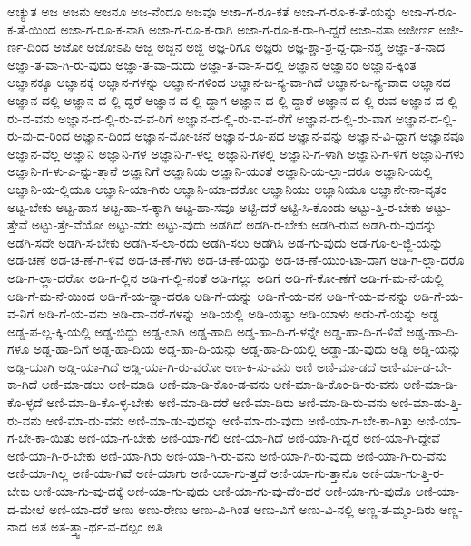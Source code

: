 {ಅಚ್ಯುತ
ಅಜ
ಅಜನು
ಅಜನೂ
ಅಜ-ನೆಂದೂ
ಅಜವೂ
ಅಜಾ-ಗ-ರೂ-ಕತೆ
ಅಜಾ-ಗ-ರೂ-ಕ-ತೆ-ಯನ್ನು
ಅಜಾ-ಗ-ರೂ-ಕ-ತೆ-ಯಿಂದ
ಅಜಾ-ಗ-ರೂ-ಕ-ನಾಗಿ
ಅಜಾ-ಗ-ರೂ-ಕ-ರಾಗಿ
ಅಜಾ-ಗ-ರೂ-ಕ-ರಾ-ಗಿ-ದ್ದರೆ
ಅಜಾ-ನತಾ
ಅಜೀರ್ಣ
ಅಜೀ-ರ್ಣ-ದಿಂದ
ಅಜೋ
ಅಜೋಽಪಿ
ಅಜ್ಜ
ಅಜ್ಜನ
ಅಜ್ಜಿ
ಅಜ್ಞ-ರಿಗೂ
ಅಜ್ಞರು
ಅಜ್ಞ-ಶ್ಚಾ-ಶ್ರ-ದ್ದ-ಧಾ-ನಶ್ಚ
ಅಜ್ಞಾ-ತ-ನಾದ
ಅಜ್ಞಾ-ತ-ವಾ-ಗಿ-ರು-ವುದು
ಅಜ್ಞಾ-ತ-ವಾ-ದುದು
ಅಜ್ಞಾ-ತ-ವಾ-ಸ-ದಲ್ಲಿ
ಅಜ್ಞಾನ
ಅಜ್ಞಾನಂ
ಅಜ್ಞಾನ-ಕ್ಕಿಂತ
ಅಜ್ಞಾನಕ್ಕೂ
ಅಜ್ಞಾನಕ್ಕೆ
ಅಜ್ಞಾನ-ಗಳನ್ನು
ಅಜ್ಞಾನ-ಗಳಿಂದ
ಅಜ್ಞಾನ-ಜ-ನ್ಯ-ವಾ-ಗಿದೆ
ಅಜ್ಞಾನ-ಜ-ನ್ಯ-ವಾದ
ಅಜ್ಞಾನದ
ಅಜ್ಞಾನ-ದಲ್ಲಿ
ಅಜ್ಞಾನ-ದ-ಲ್ಲಿ-ದ್ದರೆ
ಅಜ್ಞಾನ-ದ-ಲ್ಲಿ-ದ್ದಾಗ
ಅಜ್ಞಾನ-ದ-ಲ್ಲಿ-ದ್ದಾರೆ
ಅಜ್ಞಾನ-ದ-ಲ್ಲಿ-ರುವ
ಅಜ್ಞಾನ-ದ-ಲ್ಲಿ-ರು-ವ-ವನು
ಅಜ್ಞಾನ-ದ-ಲ್ಲಿ-ರು-ವ-ವ-ರಿಗೆ
ಅಜ್ಞಾನ-ದ-ಲ್ಲಿ-ರು-ವ-ವ-ರೆಗೆ
ಅಜ್ಞಾನ-ದ-ಲ್ಲಿ-ರು-ವಾಗ
ಅಜ್ಞಾನ-ದ-ಲ್ಲಿ-ರು-ವು-ದ-ರಿಂದ
ಅಜ್ಞಾನ-ದಿಂದ
ಅಜ್ಞಾನ-ಮೋ-ಚನೆ
ಅಜ್ಞಾನ-ರೂ-ಪದ
ಅಜ್ಞಾನ-ವನ್ನು
ಅಜ್ಞಾನ-ವಿ-ದ್ದಾಗ
ಅಜ್ಞಾನವೂ
ಅಜ್ಞಾನ-ವೆಲ್ಲ
ಅಜ್ಞಾನಿ
ಅಜ್ಞಾನಿ-ಗಳ
ಅಜ್ಞಾನಿ-ಗ-ಳಲ್ಲ
ಅಜ್ಞಾನಿ-ಗಳಲ್ಲಿ
ಅಜ್ಞಾನಿ-ಗ-ಳಾಗಿ
ಅಜ್ಞಾನಿ-ಗ-ಳಿಗೆ
ಅಜ್ಞಾನಿ-ಗಳು
ಅಜ್ಞಾನಿ-ಗ-ಳು-ಎ-ನ್ನು-ತ್ತಾನೆ
ಅಜ್ಞಾನಿಗೆ
ಅಜ್ಞಾನಿಯ
ಅಜ್ಞಾನಿ-ಯಂತೆ
ಅಜ್ಞಾನಿ-ಯ-ಲ್ಲಾ-ದರೂ
ಅಜ್ಞಾನಿ-ಯಲ್ಲಿ
ಅಜ್ಞಾನಿ-ಯ-ಲ್ಲಿಯೂ
ಅಜ್ಞಾನಿ-ಯಾ-ಗಿರು
ಅಜ್ಞಾನಿ-ಯಾ-ದರೋ
ಅಜ್ಞಾನಿಯು
ಅಜ್ಞಾನಿಯೂ
ಅಜ್ಞಾನೇ-ನಾ-ವೃತಂ
ಅಟ್ಟ-ಬೇಕು
ಅಟ್ಟ-ಹಾಸ
ಅಟ್ಟ-ಹಾ-ಸ-ಕ್ಕಾಗಿ
ಅಟ್ಟ-ಹಾ-ಸವೂ
ಅಟ್ಟಿ-ದರೆ
ಅಟ್ಟಿ-ಸಿ-ಕೊಂಡು
ಅಟ್ಟು-ತ್ತಿ-ರ-ಬೇಕು
ಅಟ್ಟು-ತ್ತೇವೆ
ಅಟ್ಟು-ತ್ತೇ-ವೆಯೋ
ಅಟ್ಟು-ವರು
ಅಟ್ಟು-ವುದು
ಅಡಗಿದೆ
ಅಡಗಿ-ರ-ಬೇಕು
ಅಡಗಿ-ರುವ
ಅಡಗಿ-ರು-ವುದನ್ನು
ಅಡಗಿ-ಸದೇ
ಅಡಗಿ-ಸ-ಬೇಕು
ಅಡಗಿ-ಸ-ಲಾ-ರದು
ಅಡಗಿ-ಸಲು
ಅಡಗಿಸಿ
ಅಡ-ಗು-ವುದು
ಅಡ-ಗೂ-ಲ-ಜ್ಜಿ-ಯನ್ನು
ಅಡ-ಚಣೆ
ಅಡ-ಚ-ಣೆ-ಗ-ಳಿವೆ
ಅಡ-ಚ-ಣೆ-ಗಳು
ಅಡ-ಚ-ಣೆ-ಯನ್ನು
ಅಡ-ಚ-ಣೆ-ಯುಂ-ಟಾ-ದಾಗ
ಅಡಿ-ಗ-ಲ್ಲಾ-ದರೊ
ಅಡಿ-ಗ-ಲ್ಲಾ-ದರೋ
ಅಡಿ-ಗ-ಲ್ಲಿನ
ಅಡಿ-ಗ-ಲ್ಲಿ-ನಂತೆ
ಅಡಿ-ಗಲ್ಲು
ಅಡಿಗೆ
ಅಡಿ-ಗೆ-ಕೋ-ಣೆಗೆ
ಅಡಿ-ಗೆ-ಮ-ನೆ-ಯಲ್ಲಿ
ಅಡಿ-ಗೆ-ಮ-ನೆ-ಯಿಂದ
ಅಡಿ-ಗೆ-ಯ-ನ್ನಾ-ದರೂ
ಅಡಿ-ಗೆ-ಯನ್ನು
ಅಡಿ-ಗೆ-ಯ-ವನ
ಅಡಿ-ಗೆ-ಯ-ವ-ನನ್ನು
ಅಡಿ-ಗೆ-ಯ-ವ-ನಿಗೆ
ಅಡಿ-ಗೆ-ಯ-ವನು
ಅಡಿ-ದಾ-ವರೆ-ಗಳನ್ನು
ಅಡಿ-ಯಲ್ಲಿ
ಅಡಿ-ಯಷ್ಟು
ಅಡಿ-ಯಾಳು
ಅಡು-ಗೆ-ಯನ್ನು
ಅಡ್ಡ
ಅಡ್ಡ-ಪ-ಲ್ಲ-ಕ್ಕಿ-ಯಲ್ಲಿ
ಅಡ್ಡ-ಬಿದ್ದು
ಅಡ್ಡ-ಲಾಗಿ
ಅಡ್ಡ-ಹಾದಿ
ಅಡ್ಡ-ಹಾ-ದಿ-ಗ-ಳನ್ನೇ
ಅಡ್ಡ-ಹಾ-ದಿ-ಗ-ಳಿವೆ
ಅಡ್ಡ-ಹಾ-ದಿ-ಗಳೂ
ಅಡ್ಡ-ಹಾ-ದಿಗೆ
ಅಡ್ಡ-ಹಾ-ದಿಯ
ಅಡ್ಡ-ಹಾ-ದಿ-ಯನ್ನು
ಅಡ್ಡ-ಹಾ-ದಿ-ಯಲ್ಲಿ
ಅಡ್ಡಾ-ಡು-ವುದು
ಅಡ್ಡಿ
ಅಡ್ಡಿ-ಯನ್ನು
ಅಡ್ಡಿ-ಯಾಗಿ
ಅಡ್ಡಿ-ಯಾ-ಗಿದೆ
ಅಡ್ಡಿ-ಯಾ-ಗಿ-ರು-ವರೋ
ಅಣ-ಕಿ-ಸು-ವನು
ಅಣಿ
ಅಣಿ-ಮಾ-ಡದೆ
ಅಣಿ-ಮಾ-ಡ-ಬೇ-ಕಾ-ಗಿದೆ
ಅಣಿ-ಮಾ-ಡಲು
ಅಣಿ-ಮಾಡಿ
ಅಣಿ-ಮಾ-ಡಿ-ಕೊಂ-ಡ-ವನು
ಅಣಿ-ಮಾ-ಡಿ-ಕೊಂ-ಡಿ-ರು-ವನು
ಅಣಿ-ಮಾ-ಡಿ-ಕೊ-ಳ್ಳದೆ
ಅಣಿ-ಮಾ-ಡಿ-ಕೊ-ಳ್ಳ-ಬೇಕು
ಅಣಿ-ಮಾ-ಡಿ-ದರೆ
ಅಣಿ-ಮಾ-ಡಿರು
ಅಣಿ-ಮಾ-ಡಿ-ರು-ವನು
ಅಣಿ-ಮಾ-ಡು-ತ್ತಿ-ರು-ವನು
ಅಣಿ-ಮಾ-ಡು-ವನು
ಅಣಿ-ಮಾ-ಡು-ವುದನ್ನು
ಅಣಿ-ಮಾ-ಡು-ವುದು
ಅಣಿ-ಯಾ-ಗ-ಬೇ-ಕಾ-ಗಿತ್ತು
ಅಣಿ-ಯಾ-ಗ-ಬೇ-ಕಾ-ಯಿತು
ಅಣಿ-ಯಾ-ಗ-ಬೇಕು
ಅಣಿ-ಯಾ-ಗಲಿ
ಅಣಿ-ಯಾ-ಗಿದೆ
ಅಣಿ-ಯಾ-ಗಿ-ದ್ದರೆ
ಅಣಿ-ಯಾ-ಗಿ-ದ್ದೇವೆ
ಅಣಿ-ಯಾ-ಗಿ-ರ-ಬೇಕು
ಅಣಿ-ಯಾ-ಗಿರು
ಅಣಿ-ಯಾ-ಗಿ-ರು-ವನು
ಅಣಿ-ಯಾ-ಗಿ-ರು-ವುದು
ಅಣಿ-ಯಾ-ಗಿ-ರು-ವೆನು
ಅಣಿ-ಯಾ-ಗಿಲ್ಲ
ಅಣಿ-ಯಾ-ಗಿವೆ
ಅಣಿ-ಯಾಗು
ಅಣಿ-ಯಾ-ಗು-ತ್ತದೆ
ಅಣಿ-ಯಾ-ಗು-ತ್ತಾನೊ
ಅಣಿ-ಯಾ-ಗು-ತ್ತಿ-ರ-ಬೇಕು
ಅಣಿ-ಯಾ-ಗು-ವು-ದಕ್ಕೆ
ಅಣಿ-ಯಾ-ಗು-ವುದು
ಅಣಿ-ಯಾ-ಗು-ವು-ದೆಂ-ದರೆ
ಅಣಿ-ಯಾ-ಗು-ವುದೊ
ಅಣಿ-ಯಾ-ದ-ಮೇಲೆ
ಅಣಿ-ಯಾ-ದರೆ
ಅಣು
ಅಣು-ರೇಣು
ಅಣು-ವಿ-ಗಿಂತ
ಅಣು-ವಿಗೆ
ಅಣು-ವಿ-ನಲ್ಲಿ
ಅಣ್ಣ-ತ-ಮ್ಮಂ-ದಿರು
ಅಣ್ಣ-ನಾದ
ಅತ
ಅತ-ತ್ತ್ವಾ-ರ್ಥ-ವ-ದಲ್ಪಂ
ಅತಿ
}
